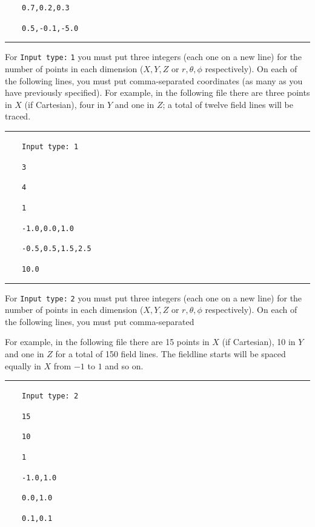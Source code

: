 \documentclass[12pt,twoside]{article}
\begin{document}
$\quad\quad$\texttt{0.7,0.2,0.3}

$\quad\quad$\texttt{0.5,-0.1,-5.0}

\noindent\rule{\linewidth}{0.4pt}

\vspace{2mm}

For \texttt{Input type:} \texttt{1} you must put three integers (each one on a new line) for the number of points in each dimension ($X,Y,Z$ or $r,\theta,\phi$ respectively). On each of the following lines, you must put comma-separated coordinates (as many as you have previously specified). For example, in the following file there are three points in $X$ (if Cartesian), four in $Y$ and one in $Z$; a total of twelve field lines will be traced.

\noindent\rule{\linewidth}{0.4pt}

$\quad\quad$\texttt{Input type: 1}

$\quad\quad$\texttt{3}

$\quad\quad$\texttt{4}

$\quad\quad$\texttt{1}

$\quad\quad$\texttt{-1.0,0.0,1.0}

$\quad\quad$\texttt{-0.5,0.5,1.5,2.5}

$\quad\quad$\texttt{10.0}

\noindent\rule{\linewidth}{0.4pt}

For \texttt{Input type:} \texttt{2} you must put three integers (each one on a new line) for the number of points in each dimension ($X,Y,Z$ or $r,\theta,\phi$ respectively). On each of the following lines, you must put comma-separated 

For example, in the following file there are 15 points in $X$ (if Cartesian), 10 in $Y$ and one in $Z$ for a total of 150 field lines. The fieldline starts will be spaced equally in $X$ from $-1$ to $1$ and so on.

\vspace{2mm}

\noindent\rule{\linewidth}{0.4pt}

$\quad\quad$\texttt{Input type: 2}

$\quad\quad$\texttt{15}

$\quad\quad$\texttt{10}

$\quad\quad$\texttt{1}

$\quad\quad$\texttt{-1.0,1.0}

$\quad\quad$\texttt{0.0,1.0}

$\quad\quad$\texttt{0.1,0.1}
\end{document}
